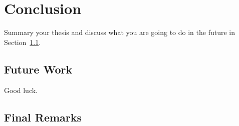 \chapter{Conclusion}
\label{cha:conc}
Summary your thesis and discuss what you are going to do in the future in Section~\ref{sec:future}.

\section{Future Work}
\label{sec:future}
Good luck.

\section{Final Remarks}



